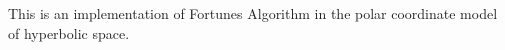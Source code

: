 This is an implementation of Fortune\textquotesingle{}s Algorithm in the polar coordinate model of hyperbolic space. 